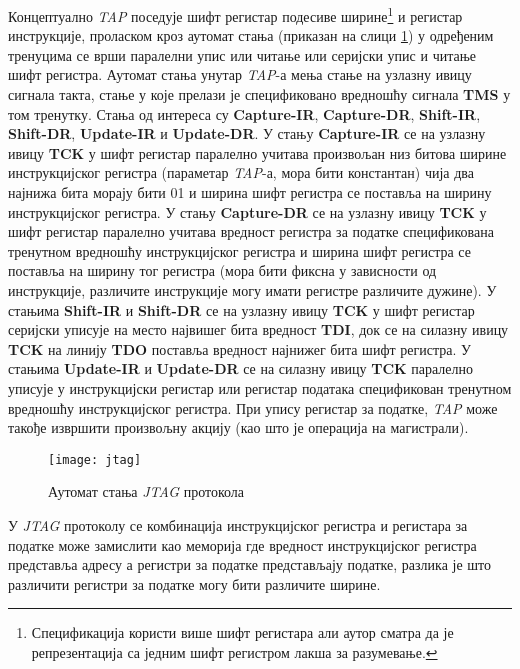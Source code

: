 Концептуално \textit{\acrshort{TAP}} поседује шифт регистар подесиве ширине\footnote{Спецификација користи више шифт регистара али аутор сматра да је репрезентација са једним шифт регистром лакша за разумевање.} и регистар инструкције, проласком кроз аутомат стања (приказан на слици \ref{fig:jtag}) у одређеним тренуцима се врши паралелни упис или читање или серијски упис и читање шифт регистра. Аутомат стања унутар \textit{\acrshort{TAP}}-а мења стање на узлазну ивицу сигнала такта, стање у које прелази је спецификовано вредношћу сигнала \textbf{\acrshort{TMS}} у том тренутку.
Стања од интереса су \textbf{Capture-\acrshort{IR}}, \textbf{Capture-\acrshort{DR}}, \textbf{Shift-\acrshort{IR}}, \textbf{Shift-\acrshort{DR}}, \textbf{Update-\acrshort{IR}} и \textbf{Update-\acrshort{DR}}. 
У стању \textbf{Capture-\acrshort{IR}} се на узлазну ивицу \textbf{\acrshort{TCK}} у шифт регистар паралелно учитава произвољан низ битова ширине инструкцијског регистра (параметар \textit{\acrshort{TAP}}-а, мора бити константан) чија два најнижа бита морају бити 01 и ширина шифт регистра се поставља на ширину инструкцијског регистра. У стању \textbf{Capture-\acrshort{DR}} се на узлазну ивицу \textbf{\acrshort{TCK}} у шифт регистар паралелно учитава вредност регистра за податке спецификована тренутном вредношћу инструкцијског регистра и ширина шифт регистра се поставља на ширину тог регистра (мора бити фиксна у зависности од инструкције, различите инструкције могу имати регистре различите дужине). У стањима \textbf{Shift-\acrshort{IR}} и \textbf{Shift-\acrshort{DR}} се на узлазну ивицу \textbf{\acrshort{TCK}} у шифт регистар серијски уписује на место највишег бита вредност \textbf{\acrshort{TDI}}, док се на силазну ивицу \textbf{\acrshort{TCK}} на линију \textbf{\acrshort{TDO}} поставља вредност најнижег бита шифт регистра. У стањима \textbf{Update-\acrshort{IR}} и \textbf{Update-\acrshort{DR}} се на силазну ивицу \textbf{\acrshort{TCK}} паралелно уписује у инструкцијски регистар или регистар података спецификован тренутном вредношћу инструкцијског регистра. При упису регистар за податке, \textit{\acrshort{TAP}} може такође извршити произвољну акцију (као што је операција на магистрали).

\begin{figure}[h!]
	\centering
	\texttt{[image: jtag]}
	\caption{Аутомат стања \textit{\acrshort{JTAG}} протокола \cite{jtag_spec}}
	\label{fig:jtag}
\end{figure}

У \textit{\acrshort{JTAG}} протоколу се комбинација инструкцијског регистра и регистара за податке може замислити као меморија где вредност инструкцијског регистра представља адресу а регистри за податке представљају податке, разлика је што различити регистри за податке могу бити различите ширине.

